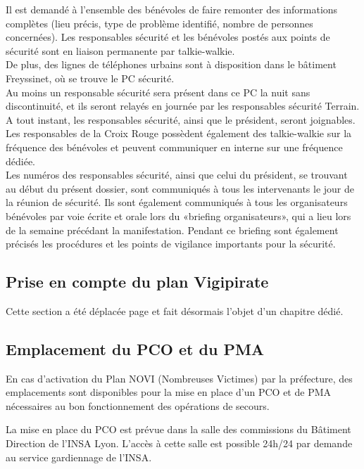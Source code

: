 \documentclass[hidelinks, paper=a4, fontsize=13pt]{report}
\begin{document}
Il est demandé à l’ensemble des bénévoles de faire remonter des informations complètes (lieu précis, type de problème identifié, nombre de personnes concernées). Les responsables sécurité et les bénévoles postés aux points de sécurité sont en liaison permanente par talkie-walkie. \\

De plus, des lignes de téléphones urbains sont à disposition dans le bâtiment Freyssinet, où se trouve le PC sécurité. \\
Au moins un responsable sécurité sera présent dans ce PC la nuit sans discontinuité, et ils seront relayés en journée par les responsables sécurité Terrain. A tout instant, les responsables sécurité, ainsi que le président, seront joignables.\\

Les responsables de la Croix Rouge possèdent également des talkie-walkie sur la fréquence des bénévoles et peuvent communiquer en interne sur une fréquence dédiée. \\

Les numéros des responsables sécurité, ainsi que celui du président, se trouvant au début du présent dossier, sont communiqués à tous les intervenants le jour de la réunion de sécurité. Ils sont également communiqués à tous les organisateurs bénévoles par voie écrite et orale lors du «briefing organisateurs», qui a lieu lors de la semaine précédant la manifestation. Pendant ce briefing sont également précisés les procédures et les points de vigilance importants pour la sécurité.\\


\subsection{Prise en compte du plan Vigipirate}
Cette section a été déplacée page \pageref{refVigipirate} et fait désormais l'objet d'un chapitre dédié.

\subsection{Emplacement du PCO et du PMA}
\label{refProcedurePMA}

En cas d’activation du Plan NOVI (Nombreuses  Victimes) par la préfecture, des emplacements sont disponibles pour la mise en place d'un PCO et de PMA nécessaires au bon fonctionnement des opérations de secours. 

La mise en place du PCO est prévue dans la salle des commissions du Bâtiment Direction de l’INSA Lyon. L’accès à cette salle est possible 24h/24 par demande au service gardiennage de l’INSA.
\end{document}
